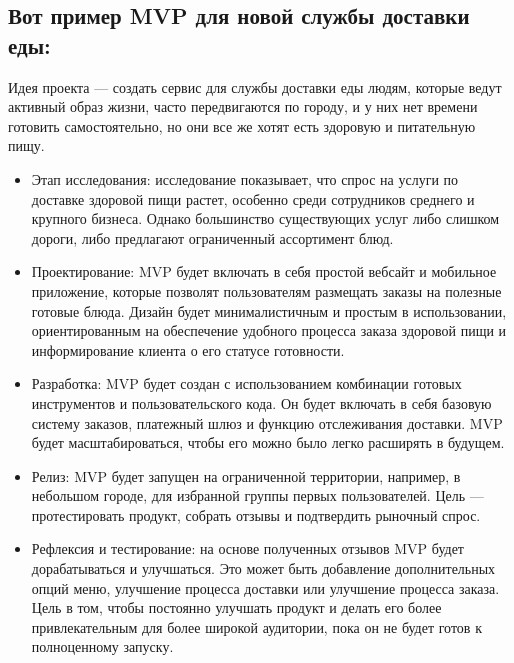\documentclass[letterpaper,10pt,russian]{sphinxmanual}
\begin{document}
\subsection{Вот пример MVP для новой службы доставки еды:}
\label{\detokenize{educational_materials/mvp/content:id5}}
\sphinxAtStartPar
Идея проекта — создать сервис для службы доставки еды людям, которые ведут активный образ жизни, часто передвигаются по городу, и у них нет времени готовить самостоятельно, но они все же хотят есть здоровую и питательную пищу.
\begin{itemize}
\item {} 
\sphinxAtStartPar
Этап исследования: исследование показывает, что спрос на услуги по доставке здоровой пищи растет, особенно среди сотрудников среднего и крупного бизнеса. Однако большинство существующих услуг либо слишком дороги, либо предлагают ограниченный ассортимент блюд.

\item {} 
\sphinxAtStartPar
Проектирование: MVP будет включать в себя простой веб\sphinxhyphen{}сайт и мобильное приложение, которые позволят пользователям размещать заказы на полезные готовые блюда. Дизайн будет минималистичным и простым в использовании, ориентированным на обеспечение удобного процесса заказа здоровой пищи и информирование клиента о его статусе готовности.

\item {} 
\sphinxAtStartPar
Разработка: MVP будет создан с использованием комбинации готовых инструментов и пользовательского кода. Он будет включать в себя базовую систему заказов, платежный шлюз и функцию отслеживания доставки. MVP будет масштабироваться, чтобы его можно было легко расширять в будущем.

\item {} 
\sphinxAtStartPar
Релиз: MVP будет запущен на ограниченной территории, например, в небольшом городе, для избранной группы первых пользователей. Цель — протестировать продукт, собрать отзывы и подтвердить рыночный спрос.

\item {} 
\sphinxAtStartPar
Рефлексия и тестирование: на основе полученных отзывов MVP будет дорабатываться и улучшаться. Это может быть добавление дополнительных опций меню, улучшение процесса доставки или улучшение процесса заказа. Цель в том, чтобы постоянно улучшать продукт и делать его более привлекательным для более широкой аудитории, пока он не будет готов к полноценному запуску.

\end{itemize}
\end{document}
